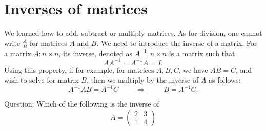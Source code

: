 \documentclass{ximera}
\begin{document}
\section{Inverses of matrices}


We learned how to add, subtract or multiply matrices. As for division, one cannot write $\frac{A}{B}$ for matrices $A$ and $B$. We need to introduce the inverse of a matrix. For a matrix $A: n\times n$, its inverse, denoted as $A^{-1}: n\times n$ is a matrix such that
\begin{equation}\label{inverse}
AA^{-1}= A^{-1}A = I. 
\end{equation}
Using this property, if for example, for matrices $A, B, C$, we have $AB = C$, and wish to solve for matrix $B$, then we multiply by the inverse of $A$ as follows:
\begin{equation*}
A^{-1}AB= A^{-1}C \hspace{1cm} \Rightarrow \hspace{1cm} B = A^{-1}C.
\end{equation*}

Question: Which of the following is the inverse of
\begin{equation*}
A= \left(\begin{array}{cc}
  2 & 3   \\
  1 &  4
\end{array}\right)
\end{equation*}
\begin{multipleChoice}





\end{multipleChoice}
\end{document}
